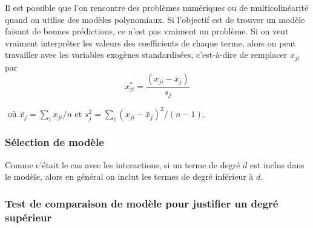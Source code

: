 Il est possible que l'on rencontre des problèmes numériques ou
de multicolinéarité quand on utilise des modèles polynomiaux. Si l'objectif est de trouver un modèle faisant de bonnes prédictions, ce n'est pas vraiment un problème. Si on veut vraiment interpréter les valeurs des coefficients de chaque terme, alors on peut travailler avec les variables exogènes standardisées, c'est-à-dire de
remplacer $x_{ji}$ par
$$x_{ji}^*=\frac{(x_{ji}-\bar{x}_j)}{s_j}$$

$ \mbox{ o\`u } \bar{x_j}=\sum_ix_{ji}/n \mbox{ et } s_j^2=\sum_i(x_{ji}-\bar{x}_j)^2/(n-1).$

\subsubsection*{Sélection de modèle}

Comme c'était le cas avec les interactions, si un terme de
degré $d$ est inclus dans le modèle, alors en général on
inclut les termes de degré inférieur \`a $d$.%




\subsubsection*{Test de comparaison de modèle pour justifier un degré supérieur}


